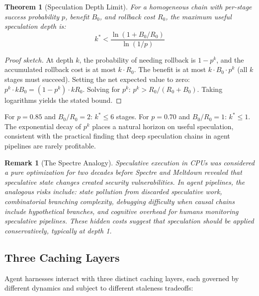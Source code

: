 \documentclass[11pt, a4paper, logo, copyright]{googledeepmind}
\newtheorem{theorem}{Theorem}[section]
\newtheorem*{remark}{Remark}
\begin{document}
\begin{theorem}[Speculation Depth Limit]
\label{thm:depth-limit}
For a homogeneous chain with per-stage success probability $p$, benefit $B_0$, and rollback cost $R_0$, the maximum useful speculation depth is:
\begin{equation}
    k^* < \frac{\ln(1 + B_0/R_0)}{\ln(1/p)}
\end{equation}
\end{theorem}

\begin{proof}[Proof sketch]
At depth $k$, the probability of needing rollback is $1 - p^k$, and the accumulated rollback cost is at most $k \cdot R_0$. The benefit is at most $k \cdot B_0 \cdot p^k$ (all $k$ stages must succeed). Setting the net expected value to zero: $p^k \cdot k B_0 = (1 - p^k) \cdot k R_0$. Solving for $p^k$: $p^k > R_0/(R_0 + B_0)$. Taking logarithms yields the stated bound.
\end{proof}

For $p = 0.85$ and $B_0/R_0 = 2$: $k^* \leq 6$ stages. For $p = 0.70$ and $B_0/R_0 = 1$: $k^* \leq 1$. The exponential decay of $p^k$ places a natural horizon on useful speculation, consistent with the practical finding that deep speculation chains in agent pipelines are rarely profitable.

\begin{remark}[The Spectre Analogy]
Speculative execution in CPUs was considered a pure optimization for two decades before Spectre and Meltdown revealed that speculative state changes created security vulnerabilities. In agent pipelines, the analogous risks include: state pollution from discarded speculative work, combinatorial branching complexity, debugging difficulty when causal chains include hypothetical branches, and cognitive overhead for humans monitoring speculative pipelines. These hidden costs suggest that speculation should be applied conservatively, typically at depth 1.
\end{remark}

\subsection{Three Caching Layers}

Agent harnesses interact with three distinct caching layers, each governed by different dynamics and subject to different staleness tradeoffs:
\end{document}

